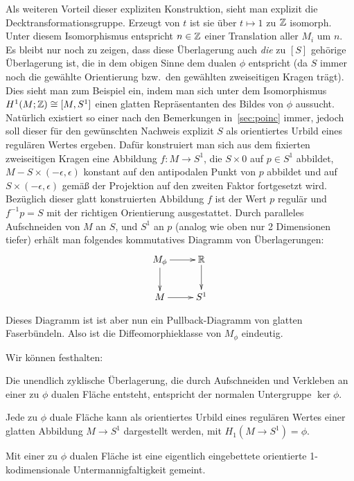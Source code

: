 \begin{constr}
	Als weiteren Vorteil dieser expliziten Konstruktion, sieht man explizit die Decktransformationsgruppe. Erzeugt von $t$ ist sie über $t\mapsto 1$ zu $\mathbb{Z}$ isomorph. Unter diesem Isomorphismus entspricht $n\in \mathbb{Z}$ einer Translation aller $M_i$ um $n$. Es bleibt nur noch zu zeigen, dass diese Überlagerung auch \textit{die} zu $[S]$ gehörige Überlagerung ist, die in dem obigen Sinne dem dualen $\phi$ entspricht (da $S$ immer noch die gewählte Orientierung bzw.\ den gewählten zweiseitigen Kragen trägt). Dies sieht man zum Beispiel ein, indem man sich unter dem Isomorphismus $H^1(M;\mathbb{Z})\cong [M,S^1]$ einen glatten Repräsentanten des Bildes von $\phi$ aussucht. Natürlich existiert so einer nach den Bemerkungen in~\ref{sec:poinc} immer, jedoch soll dieser für den gewünschten Nachweis explizit $S$ als orientiertes Urbild eines regulären Wertes ergeben. Dafür konstruiert man sich aus dem fixierten zweiseitigen Kragen eine Abbildung $f:M\to S^1$, die $S\times 0$ auf $p\in S^1$ abbildet, $M-S \times (-\epsilon,\epsilon)$ konstant auf den antipodalen Punkt von $p$ abbildet und auf $S\times (-\epsilon,\epsilon)$ gemäß der Projektion auf den zweiten Faktor fortgesetzt wird. Bezüglich dieser glatt konstruierten Abbildung $f$ ist der Wert $p$ regulär und $f^{-1}p=S$ mit der richtigen Orientierung ausgestattet. Durch paralleles Aufschneiden von $M$ an $S$, und $S^1$ an $p$ (analog wie oben nur 2 Dimensionen tiefer) erhält man folgendes kommutatives Diagramm von Überlagerungen:
	\[
		\begin{xy}
			\xymatrix{M_\phi \ar[r] \ar[d] &\RR \ar[d]\\
						M \ar[r]& S^1}
		\end{xy}
	\]

	Dieses Diagramm ist ist aber nun ein Pullback-Diagramm von glatten Faserbündeln. Also ist die Diffeomorphieklasse von $M_\phi$ eindeutig. 
\end{constr}
Wir können festhalten:
\begin{cor}
\label{cor:verklvertr}
		Die unendlich zyklische Überlagerung, die durch Aufschneiden und Verkleben an einer zu $\phi$ dualen Fläche entsteht, entspricht der normalen Untergruppe $ \ker\phi$.
\end{cor}
\begin{cor}
\label{cor:preimage}
	Jede zu $\phi$ duale Fläche kann als orientiertes Urbild eines regulären Wertes einer glatten Abbildung $M\to S^1$ dargestellt werden, mit $H_1(M \to S^1)=\phi$.
\end{cor}
Mit einer zu $\phi$ dualen Fläche ist eine eigentlich eingebettete orientierte 1-kodimensionale Untermannigfaltigkeit gemeint.


